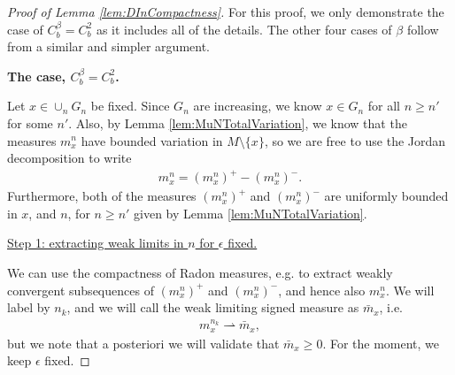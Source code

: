 \documentclass[11pt,reqno]{amsart}
\numberwithin{equation}{section}
\theoremstyle{plain}
\def\union{\cup}
\begin{document}
\begin{proof}[Proof of Lemma \ref{lem:DInCompactness}]
	For this proof, we only demonstrate the case of $C^\beta_b=C^2_b$ as it includes all of the details.  The other four cases of $\beta$ follow from a similar and simpler argument.
	
	\textbf{The case, $C^\beta_b =C^2_b$.}
	
	
	Let $x\in\union_n G_{n}$ be fixed.  Since $G_n$ are increasing, we know $x\in G_n$ for all $n\geq n'$ for some $n'$.  Also, by Lemma \ref{lem:MuNTotalVariation}, we know that the measures $m_x^n$ have bounded variation in $M\setminus \{x\}$, so we are free to use the Jordan decomposition to write
	\begin{align*}
		m_x^{n} = (m_x^{n})^+ - (m_x^{n})^-.
	\end{align*}
	Furthermore, both of the measures $(m_x^{n})^+$ and $(m_x^{n})^-$ are uniformly bounded in $x$, and $n$, for $n\geq n'$ given by Lemma \ref{lem:MuNTotalVariation}.  
	

	
	\underline{Step 1: extracting weak limits in $n$ for $\epsilon$ fixed.}
	
	We can use the compactness of Radon measures, e.g. \cite[p. 55]{EvGa-92} to extract weakly convergent subsequences of $(m_x^n)^+$ and $(m_x^n)^-$, and hence also $m_x^n$.  We will label by $n_k$, and we will call the weak limiting signed measure as $\bar m_x$, i.e.
	\begin{align*}
		m^{n_k}_x \rightharpoonup \bar m_x,
	\end{align*}
	but we note that a posteriori we will validate that $\bar m_x\geq0$.
	For the moment, we keep $\epsilon$ fixed. 
	

\end{proof}
\end{document}

